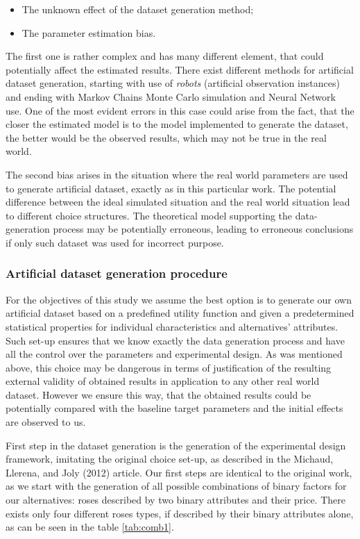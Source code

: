\documentclass[11pt,]{article}
\providecommand{\tightlist}{%
  \setlength{\itemsep}{0pt}\setlength{\parskip}{0pt}}
\begin{document}
\begin{itemize}
\tightlist
\item
  The unknown effect of the dataset generation method;
\item
  The parameter estimation bias.
\end{itemize}

The first one is rather complex and has many different element, that
could potentially affect the estimated results. There exist different
methods for artificial dataset generation, starting with use of
\emph{robots} (artificial observation instances) and ending with Markov
Chains Monte Carlo simulation and Neural Network use. One of the most
evident errors in this case could arise from the fact, that the closer
the estimated model is to the model implemented to generate the dataset,
the better would be the observed results, which may not be true in the
real world.

The second bias arises in the situation where the real world parameters
are used to generate artificial dataset, exactly as in this particular
work. The potential difference between the ideal simulated situation and
the real world situation lead to different choice structures. The
theoretical model supporting the data-generation process may be
potentially erroneous, leading to erroneous conclusions if only such
dataset was used for incorrect purpose.

\hypertarget{artificial-dataset-generation-procedure}{%
\subsubsection{Artificial dataset generation
procedure}\label{artificial-dataset-generation-procedure}}

For the objectives of this study we assume the best option is to
generate our own artificial dataset based on a predefined utility
function and given a predetermined statistical properties for individual
characteristics and alternatives' attributes. Such set-up ensures that
we know exactly the data generation process and have all the control
over the parameters and experimental design. As was mentioned above,
this choice may be dangerous in terms of justification of the resulting
external validity of obtained results in application to any other real
world dataset. However we ensure this way, that the obtained results
could be potentially compared with the baseline target parameters and
the initial effects are observed to us.

First step in the dataset generation is the generation of the
experimental design framework, imitating the original choice set-up, as
described in the Michaud, Llerena, and Joly (2012) article. Our first
steps are identical to the original work, as we start with the
generation of all possible combinations of binary factors for our
alternatives: roses described by two binary attributes and their price.
There exists only four different roses types, if described by their
binary attributes alone, as can be seen in the table \ref{tab:comb1}.
\end{document}
